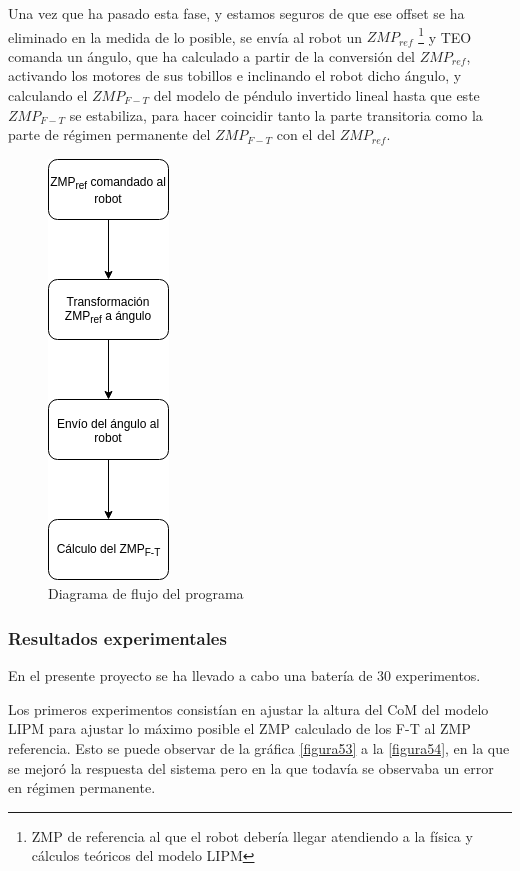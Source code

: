 \begin{enumerate}
Una vez que ha pasado esta fase, y estamos seguros de que ese offset se ha eliminado en la medida de lo posible, se envía al robot un $ZMP_{ref}$ \footnote{ZMP de referencia al que el robot debería llegar atendiendo a la física y cálculos teóricos del modelo LIPM} y TEO comanda un ángulo, que ha calculado a partir de la conversión del $ZMP_{ref}$, activando los motores de sus tobillos e inclinando el robot dicho ángulo, y calculando el $ZMP_{F-T}$ del modelo de péndulo invertido lineal hasta que este $ZMP_{F-T}$ se estabiliza, para hacer coincidir tanto la parte transitoria como la parte de régimen permanente del $ZMP_{F-T}$ con el del $ZMP_{ref}$.

\end{enumerate}

\begin{figure}[H]
\centering
\includegraphics[scale=0.5]{imagenes/apartado_5/5.1/52_diagrama_flujo1}
\caption{Diagrama de flujo del programa}
\label{figura52}
\end{figure}


\subsubsection{Resultados experimentales}

En el presente proyecto se ha llevado a cabo una batería de 30 experimentos.

Los primeros experimentos consistían en ajustar la altura del CoM del modelo LIPM para ajustar lo máximo posible el ZMP calculado de los F-T al ZMP referencia. Esto se puede observar de la gráfica \ref{figura53} a la \ref{figura54}, en la que se mejoró la respuesta del sistema pero en la que todavía se observaba un error en régimen permanente.

